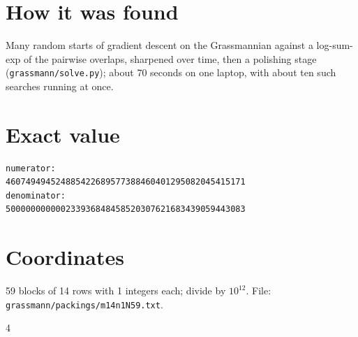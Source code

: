 \documentclass[11pt,a4paper]{article}
\begin{document}
\section{How it was found}
Many random starts of gradient descent on the Grassmannian against a log-sum-exp of the pairwise overlaps, sharpened over time, then a polishing stage (\texttt{grassmann/solve.py}); about 70 seconds on one laptop, with about ten such searches running at once.


\appendix
\section{Exact value}
{\small
\begin{verbatim}
numerator:
460749494524885422689577388460401295082045415171
denominator:
500000000000233936848458520307621683439059443083
\end{verbatim}}

\section{Coordinates}
59 blocks of 14 rows with 1 integers each; divide by $10^{12}$. File: \texttt{grassmann/packings/m14n1N59.txt}.
{\tiny
\begin{multicols}{4}
\end{multicols}}
\end{document}

